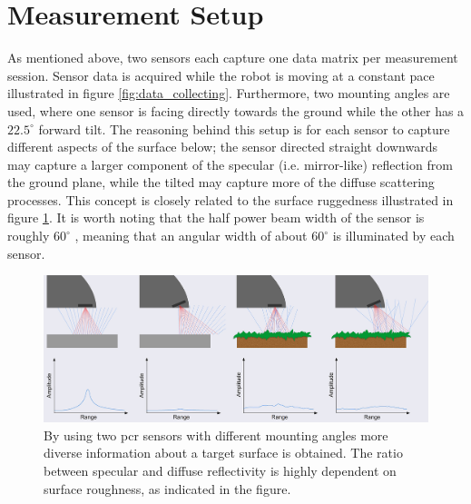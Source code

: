 \section{Measurement Setup}\label{sec:setup}

As mentioned above, two sensors each capture one data matrix per measurement session. Sensor data is acquired while the robot is moving at a constant pace illustrated in figure \ref{fig:data_collecting}. Furthermore, two mounting angles are used, where one sensor is facing directly towards the ground while the other has a $22.5^\circ$ forward tilt. The reasoning behind this setup is for each sensor to capture different aspects of the surface below; the sensor directed straight downwards may capture a larger component of the specular (i.e. mirror-like) reflection from the ground plane, while the tilted may capture more of the diffuse scattering processes. This concept is closely related to the surface ruggedness illustrated in figure \ref{fig:reflections}. It is worth noting that the half power beam width of the sensor is roughly $60^\circ$ \citep{acconeer_datasheet_a111}, meaning that an angular width of about $60^\circ$ is illuminated by each sensor.

\begin{figure}[h]
	\centering
	\includegraphics[scale=0.9]{figs_temp/reflections.jpg}
	\caption{By using two \gls{pcr} sensors with different mounting angles more diverse information about a target surface is obtained. The ratio between specular and diffuse reflectivity is highly dependent on surface roughness, as indicated in the figure.} 
	\label{fig:reflections}
\end{figure}

